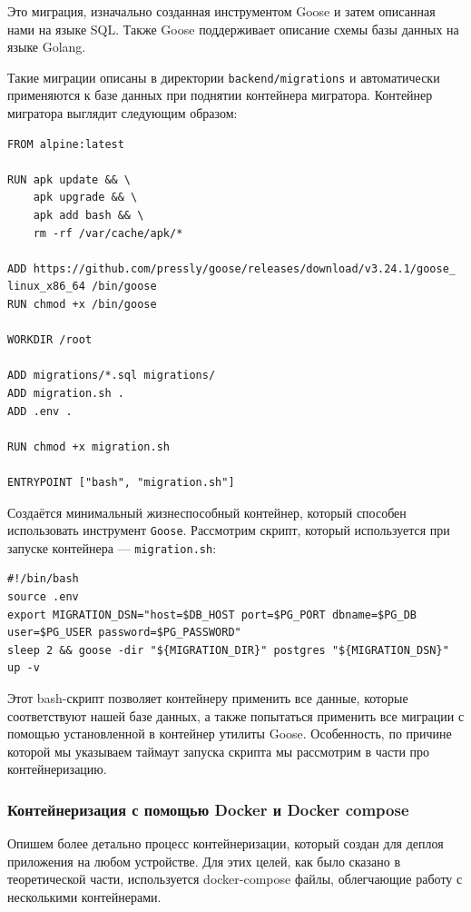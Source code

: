 \documentclass[diploma]{SCWorks}
\begin{document}
Это миграция, изначально созданная инструментом Goose и затем описанная 
нами на языке SQL. Также Goose поддерживает описание схемы базы данных на 
языке Golang.

Такие миграции описаны в директории \texttt{backend/migrations} и автоматически
применяются к базе данных при поднятии контейнера мигратора.
Контейнер мигратора выглядит следующим образом:
\begin{verbatim}
FROM alpine:latest

RUN apk update && \
    apk upgrade && \
    apk add bash && \
    rm -rf /var/cache/apk/*

ADD https://github.com/pressly/goose/releases/download/v3.24.1/goose_
linux_x86_64 /bin/goose
RUN chmod +x /bin/goose

WORKDIR /root

ADD migrations/*.sql migrations/
ADD migration.sh .
ADD .env .

RUN chmod +x migration.sh

ENTRYPOINT ["bash", "migration.sh"]
\end{verbatim}

Создаётся минимальный жизнеспособный контейнер, который способен
использовать инструмент \texttt{Goose}. Рассмотрим скрипт, который используется
при запуске контейнера — \texttt{migration.sh}:
\begin{verbatim}
#!/bin/bash
source .env
export MIGRATION_DSN="host=$DB_HOST port=$PG_PORT dbname=$PG_DB user=$PG_USER password=$PG_PASSWORD"
sleep 2 && goose -dir "${MIGRATION_DIR}" postgres "${MIGRATION_DSN}" up -v
\end{verbatim}

Этот bash-скрипт позволяет контейнеру применить все данные, 
которые соответствуют нашей базе данных, а также попытаться применить все 
миграции с помощью установленной в контейнер утилиты Goose. Особенность, 
по причине которой мы указываем таймаут запуска скрипта мы рассмотрим в части 
про контейнеризацию.

\subsubsection{Контейнеризация с помощью Docker и Docker compose}

Опишем более детально процесс контейнеризации, который создан для деплоя 
приложения на любом устройстве. Для этих целей, как было сказано в 
теоретической части, используется docker-compose файлы, облегчающие работу с
несколькими контейнерами.
\end{document}
